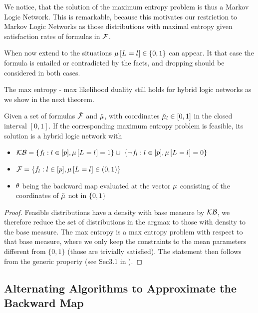We notice, that the solution of the maximum entropy problem is thus a Markov Logic Network.
This is remarkable, because this motivates our restriction to Markov Logic Networks as those distributions with maximal entropy given satisfaction rates of formulas in $\mathcal{F}$.


When now extend to the situations $\mu\left[L_{}=l_{}\right]\in\{0,1\}$ can appear.
It that case the formula is entailed or contradicted by the facts, and dropping should be considered in both cases.

The max entropy - max likelihood duality still holds for hybrid logic networks as we show in the next theorem.

\begin{theorem}
	Given a set of formulas $\tilde{\mathcal{F}}$ and $\tilde{\mu}$, with coordinates $\tilde{\mu}_l\in[0,1]$ in the closed interval $[0,1]$.
	If the corresponding maximum entropy problem is feasible, its solution is a hybrid logic network with 
	\begin{itemize}
		\item $\hardformulaset= \{\enumformula : \selindexin, \meanparamat{\indexedselvariable} = 1\} \cup  \{\lnot\enumformula : \selindexin, \meanparamat{\indexedselvariable} = 0\} $
		\item $\mathcal{F} = \{f_{l} : l\in[p], \mu\left[L_{}=l_{}\right] \in (0,1)\}$
		\item $\theta$ being the backward map evaluated at the vector $\mu$ consisting of the coordinates of $\tilde{\mu}$ not in $\{0,1\}$
	\end{itemize}
\end{theorem}
\begin{proof}
	Feasible distributions have a density with base measure by $\mathcal{KB}$, we therefore reduce the set of distributions in the argmax to those with density to the base measure.
	The max entropy is a max entropy problem with respect to that base measure, where we only keep the constraints to the mean parameters different from $\{0,1\}$ (those are trivially satisfied).
	The statement then follows from the generic property (see Sec3.1 in \cite{wainwright_graphical_2008}).
\end{proof}






\subsection{Alternating Algorithms to Approximate the Backward Map}\label{sec:alternatingParEstMLN}


